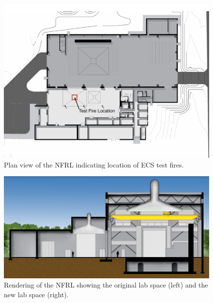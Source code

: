 \documentclass[12pt,oneside]{book}
\begin{document}
\begin{figure}[h!]
\includegraphics[width=\textwidth]{../Figures/plan_view2}
\caption {Plan view of the NFRL indicating location of ECS test fires.}
\label{fig:NFRL_plan}
\end{figure}

\begin{figure}[h!]
\includegraphics[width=\textwidth]{../Figures/section_2}
\caption {Rendering of the NFRL showing the original lab space (left) and the new lab space (right).}
\label{fig:NFRL_render}
\end{figure}
\end{document}
